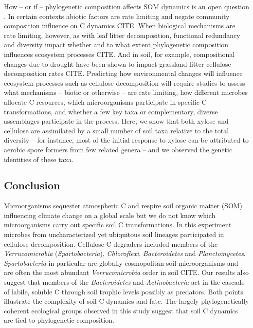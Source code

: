 How -- or if -- phylogenetic composition affects SOM dynamics is an open
question \citep{Schimel_2012}. In certain contexts abiotic factors are rate
limiting and negate community composition influence on C dynamics CITE. When
biological mechanisms are rate limiting, however, as with leaf litter
decomposition, functional redundancy and diversity impact whether and to what
extent phylogenetic composition influences ecosystem processes CITE. And in
soil, for example, compositional changes due to drought have been shown to
impact grassland litter cellulose decomposition rates CITE. Predicting how
environmental changes will influence ecosystem processes such as cellulose
decomposition will require studies to assess what mechanisms -- biotic or
otherwise -- are rate limiting, how different microbes allocate
C resources, which microorganisms participate in specific C transformations,
and whether a few key taxa or complementary, diverse assemblages participate in
the process. Here, we show that both xylose and cellulose are assimilated by
a small number of soil taxa relative to the total diversity -- for instance,
most of the initial response to xylose can be attributed to aerobic spore
formers from few related genera -- and we observed the genetic identities of
these taxa.

\subsection{Conclusion} 
Microorganisms sequester atmospheric C and respire soil organic
matter (SOM) influencing climate change on a global scale but we do not
know which microorganisms carry out specific soil C transformations. In
this experiment microbes from uncharacterized yet ubiquitous soil lineages
participated in cellulose decomposition. Cellulose C degraders included
members of the \textit{Verrucomicrobia} (\textit{Spartobacteria}),
\textit{Chloroflexi}, \textit{Bacteroidetes} and \textit{Planctomycetes}.
\textit{Spartobacteria} in particular are globally cosmopolitan soil
microorganisms and are often the most abundant \textit{Verrucomicrobia}
order in soil CITE. Our results also suggest that members of the
\textit{Bacteroidetes} and \textit{Actinobacteria} act in the cascade of
labile, soluble C through soil trophic levels possibly as predators. Both
points illustrate the complexity of soil C dynamics and fate. The largely
phylogenetically coherent ecological groups observed in this study suggest that
soil C dynamics are tied to phylogenetic composition.

